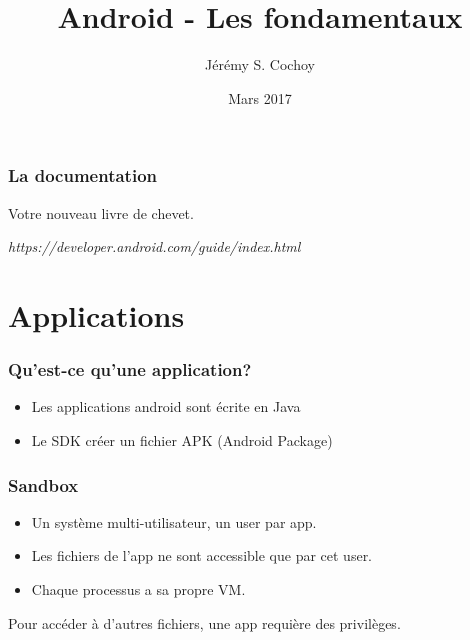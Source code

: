 \documentclass{beamer}
\begin{document}
\title{Android - Les fondamentaux}
\author{Jérémy S. Cochoy}
\date{Mars 2017}


\begin{frame}
\titlepage
\end{frame}

\begin{frame}
\tableofcontents
\end{frame}

\begin{frame}
\frametitle{La documentation}

\begin{block}{Votre nouveau livre de chevet.}
\begin{center}
\emph{https://developer.android.com/guide/index.html}
\end{center}
\end{block}

\end{frame}

\section{Applications}

\begin{frame}
\frametitle{Qu'est-ce qu'une application?}

\begin{itemize}
	\item Les applications android sont écrite en Java
	\item Le SDK créer un fichier APK (Android Package)
\end{itemize}

\end{frame}


\begin{frame}
\frametitle{Sandbox}

\begin{itemize}
	\item Un système multi-utilisateur, un user par app.
	\item Les fichiers de l'app ne sont accessible que par cet user.
	\item Chaque processus a sa propre VM.
\end{itemize}

Pour accéder à d'autres fichiers, une app requière des privilèges.

\end{frame}
\end{document}

